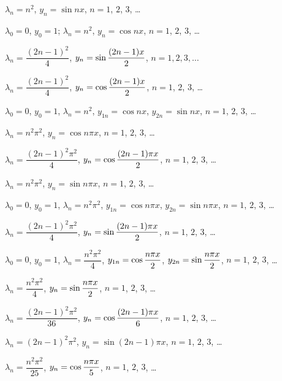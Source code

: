 

$\lambda_n=n^2$, $y_n=\sin nx$, $n=1$, $2$, $3$, \dots


$\lambda_0=0$, $y_0=1$;
$\lambda_n=n^2$, $y_n=\cos n x$, $n=1$, $2$, $3$, \dots


$\lambda_n=\dfrac{(2n-1)^2}{4}$,
$y_n=\displaystyle\sin\frac{(2n-1) x}{2}$,
$n=1,2,3,\dots$



$\lambda_n=\dfrac{(2n-1)^2}{4}$,
$y_n=\displaystyle\cos\frac{(2n-1) x}{2}$,
$n=1$, $2$, $3$, \dots


$\lambda_0=0$,  $y_0=1$,
$\lambda_n=n^2$, $y_{1n}=\cos nx$, $y_{2n}=\sin nx$,
$n=1$, $2$, $3$, \dots


$\lambda_n=n^2\pi^2$, $y_n=\cos n\pi x$, $n=1$, $2$, $3$, \dots


$\lambda_n=\dfrac{(2n-1)^2\pi^2}{4}$,
$y_n=\displaystyle\cos\frac{(2n-1)\pi x}{2}$,
$n=1$, $2$, $3$, \dots


$\lambda_n=n^2\pi^2$, $y_n=\sin n\pi x$, $n=1$, $2$, $3$, \dots



$\lambda_0=0$,  $y_0=1$,
$\lambda_n=n^2\pi^2$, $y_{1n}=\cos n\pi x$, $y_{2n}=\sin n\pi x$,
$n=1$, $2$, $3$, \dots


$\lambda_n=\dfrac{(2n-1)^2\pi^2}{4}$,
$y_n=\displaystyle\sin\frac{(2n-1)\pi x}{2}$,
$n=1$, $2$, $3$, \dots


$\lambda_0=0$,  $y_0=1$,
$\lambda_n=\dfrac{n^2\pi^2}{4}$, $y_{1n}=\displaystyle\cos\frac{n\pi x}{2}$,
$y_{2n}=\displaystyle\sin\frac{n\pi x}{2}$,
$n=1$, $2$, $3$, \dots





$\lambda_n=\dfrac{n^2\pi^2}{4}$, $y_n=\displaystyle\sin\frac{n\pi x}{2}$,
$n=1$, $2$, $3$, \dots



$\lambda_n=\dfrac{(2n-1)^2\pi^2}{36}$,
$y_n=\displaystyle\cos\frac{(2n-1)\pi x}{6}$,
$n=1$, $2$, $3$, \dots


$\lambda_n=(2n-1)^2\pi^2$,
$y_n=\sin(2n-1)\pi x$,
$n=1$, $2$, $3$, \dots



$\lambda_n=\dfrac{n^2\pi^2}{25}$, $y_n=\displaystyle\cos\frac{n\pi x}{5}$,
$n=1$, $2$, $3$, \dots

